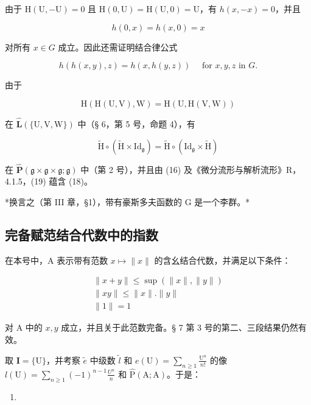 由于 \(\mathrm{H}(\mathrm{U}, -\mathrm{U}) = 0\) 且 \(\mathrm{H}(0, \mathrm{U}) = \mathrm{H}(\mathrm{U}, 0) = \mathrm{U}\)，有 \(h(x, -x) = 0\)，并且

\[
h (0, x) = h (x, 0) = x
\]

对所有 \(x \in G\) 成立。因此还需证明结合律公式

\[
h (h (x, y), z) = h (x, h (y, z)) \quad \text { for } x, y, z \text { in } G.\tag{18}
\]

由于

\[
\mathrm{H} (\mathrm{H} (\mathrm{U}, \mathrm{V}), \mathrm{W}) = \mathrm{H} (\mathrm{U}, \mathrm{H} (\mathrm{V}, \mathrm{W}))
\]

在 \(\hat{\mathbf{L}} (\{\mathrm{U},\mathrm{V},\mathrm{W}\})\) 中（§ 6，第 5 号，命题 4），有

\[
\tilde {\mathrm{H}} \circ (\tilde {\mathrm{H}} \times \mathrm{Id} _ {\mathfrak {g}}) = \tilde {\mathrm{H}} \circ (\mathrm{Id} _ {\mathfrak {g}} \times \tilde {\mathrm{H}})\tag{19}
\]

在 \(\hat{\mathbf{P}} (\mathfrak{g}\times \mathfrak{g}\times \mathfrak{g};\mathfrak{g})\) 中（第 2 号），并且由 (16) 及《微分流形与解析流形》R，4.1.5，(19) 蕴含 (18)。

*换言之（第 III 章，§1），带有豪斯多夫函数的 G 是一个李群。*

\subsection{完备赋范结合代数中的指数}

在本号中，A 表示带有范数 \(x \mapsto \| x \|\) 的含幺结合代数，并满足以下条件：

\[
\begin{array}{c} \| x + y \| \leqslant \sup (\| x \|, \| y \|) \\ \| x y \| \leqslant \| x \|. \| y \| \\ \| 1 \| = 1 \end{array}
\]

对 A 中的 \(x, y\) 成立，并且关于此范数完备。§ 7 第 3 号的第二、三段结果仍然有效。

取 \(\mathbf{I} = \{\mathrm{U}\}\)，并考察 \(\tilde e\) 中级数 \(\tilde{l}\) 和 \(e(\mathrm{U}) = \sum_{n\geqslant 1}\frac{\mathrm{U}^n}{n!}\) 的像 \(l(\mathrm{U}) = \sum_{n\geqslant 1}(-1)^{n - 1}\frac{U^n}{n}\) 和 \(\hat{\mathrm{P}} (\mathrm{A};\mathrm{A})\)。于是：

\begin{enumerate}
\def\labelenumi{(\arabic{enumi})}
\setcounter{enumi}{19}
\tightlist
\item
\end{enumerate}

